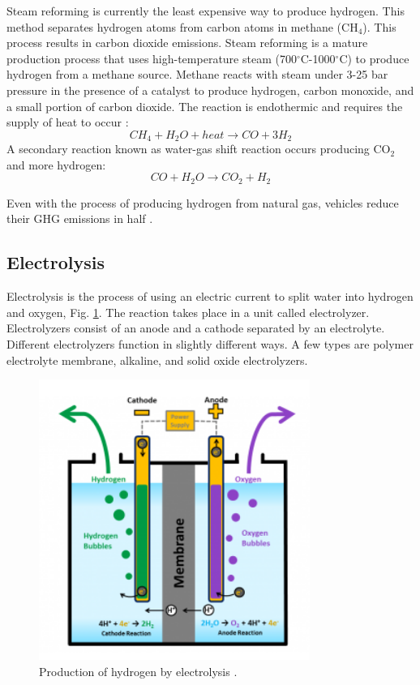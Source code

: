 \documentclass{anstrans}
\begin{document}
Steam reforming is currently the least expensive way to produce hydrogen. This method separates hydrogen atoms from carbon atoms in methane (CH$_4$). This process results in carbon dioxide emissions.
Steam reforming is a mature production process that uses high-temperature steam (700$^{\circ}$C-1000$^{\circ}$C) to produce hydrogen from a methane source. Methane reacts with steam under 3-25 bar pressure in the presence of a catalyst to produce hydrogen, carbon monoxide, and a small portion of carbon dioxide. The reaction is endothermic and requires the supply of heat to occur \cite{noauthor_hydrogen_nodate}:
\begin{equation}
CH_4 + H_2O + heat \rightarrow CO + 3H_2
\end{equation}
A secondary reaction known as water-gas shift reaction occurs producing CO$_2$ and more hydrogen:
\begin{equation}
CO + H_2O \rightarrow CO_2 + H_2
\end{equation}

Even with the process of producing hydrogen from natural gas, vehicles reduce their GHG emissions in half \cite{noauthor_hydrogen_nodate}.

\subsection{Electrolysis}

Electrolysis is the process of using an electric current to split water into hydrogen and oxygen, Fig. \ref{fig:electro}. The reaction takes place in a unit called electrolyzer. Electrolyzers consist of an anode and a cathode separated by an electrolyte. Different electrolyzers function in slightly different ways. A few types are polymer electrolyte membrane, alkaline, and solid oxide electrolyzers.

\begin{figure}[]
	\centering
	\includegraphics[width=0.55\linewidth]{figures/electrolysis.png}
	\hfill
	\caption{Production of hydrogen by electrolysis \cite{noauthor_hydrogen_nodate}.}
	\label{fig:electro}
\end{figure}
\end{document}
